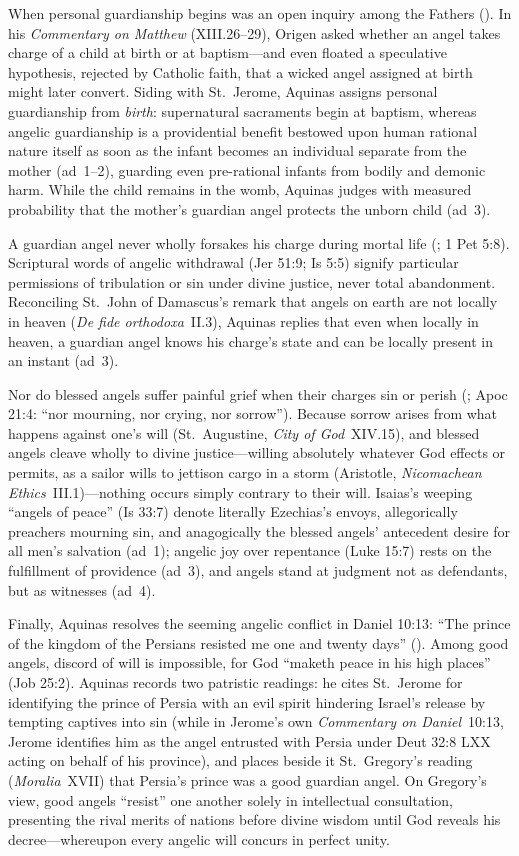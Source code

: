When personal guardianship begins was an open inquiry among the Fathers (). In his \emph{Commentary on Matthew} (XIII.26--29), Origen asked whether an angel takes charge of a child at birth or at baptism---and even floated a speculative hypothesis, rejected by Catholic faith, that a wicked angel assigned at birth might later convert. Siding with St.~Jerome, Aquinas assigns personal guardianship from \emph{birth}: supernatural sacraments begin at baptism, whereas angelic guardianship is a providential benefit bestowed upon human rational nature itself as soon as the infant becomes an individual separate from the mother (ad~1--2), guarding even pre-rational infants from bodily and demonic harm. While the child remains in the womb, Aquinas judges with measured probability that the mother's guardian angel protects the unborn child (ad~3).

A guardian angel never wholly forsakes his charge during mortal life (; 1 Pet 5:8). Scriptural words of angelic withdrawal (Jer 51:9; Is 5:5) signify particular permissions of tribulation or sin under divine justice, never total abandonment. Reconciling St.~John of Damascus's remark that angels on earth are not locally in heaven (\emph{De fide orthodoxa}~II.3), Aquinas replies that even when locally in heaven, a guardian angel knows his charge's state and can be locally present in an instant (ad~3).

Nor do blessed angels suffer painful grief when their charges sin or perish (; Apoc 21:4: ``nor mourning, nor crying, nor sorrow''). Because sorrow arises from what happens against one's will (St.~Augustine, \emph{City of God}~XIV.15), and blessed angels cleave wholly to divine justice---willing absolutely whatever God effects or permits, as a sailor wills to jettison cargo in a storm (Aristotle, \emph{Nicomachean Ethics}~III.1)---nothing occurs simply contrary to their will. Isaias's weeping ``angels of peace'' (Is 33:7) denote literally Ezechias's envoys, allegorically preachers mourning sin, and anagogically the blessed angels' antecedent desire for all men's salvation (ad~1); angelic joy over repentance (Luke 15:7) rests on the fulfillment of providence (ad~3), and angels stand at judgment not as defendants, but as witnesses (ad~4).

Finally, Aquinas resolves the seeming angelic conflict in Daniel 10:13: ``The prince of the kingdom of the Persians resisted me one and twenty days'' (). Among good angels, discord of will is impossible, for God ``maketh peace in his high places'' (Job 25:2). Aquinas records two patristic readings: he cites St.~Jerome for identifying the prince of Persia with an evil spirit hindering Israel's release by tempting captives into sin (while in Jerome's own \emph{Commentary on Daniel}~10:13, Jerome identifies him as the angel entrusted with Persia under Deut 32:8 LXX acting on behalf of his province), and places beside it St.~Gregory's reading (\emph{Moralia}~XVII) that Persia's prince was a good guardian angel. On Gregory's view, good angels ``resist'' one another solely in intellectual consultation, presenting the rival merits of nations before divine wisdom until God reveals his decree---whereupon every angelic will concurs in perfect unity.

